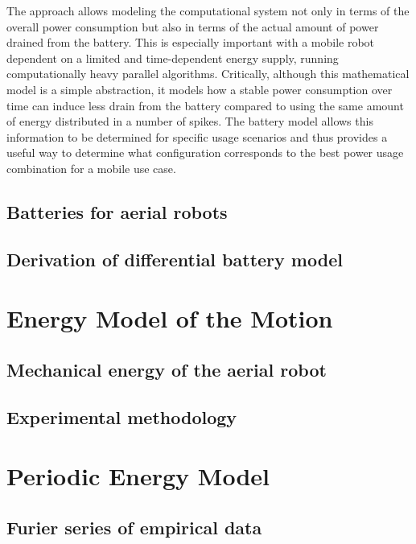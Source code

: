 The approach allows modeling the computational system not only in terms of the overall power consumption but also in terms of the actual amount of power drained from the battery. This is especially important with a mobile robot dependent on a limited and time-dependent energy supply, running computationally heavy parallel algorithms. Critically, although this mathematical model is a simple abstraction, it models how a stable power consumption over time can induce less drain from the battery compared to using the same amount of energy distributed in a number of spikes. The battery model allows this information to be determined for specific usage scenarios and thus provides a useful way to determine what configuration corresponds to the best power usage combination for a mobile use case.


\subsection{\color{orange}Batteries for aerial robots}

\subsection{\color{red}Derivation of differential battery model}


\section{\color{red}Energy Model of the Motion}

\subsection{\color{red}Mechanical energy of the aerial robot}

\subsection{\color{red}Experimental methodology}


\section{\color{red}Periodic Energy Model}

\subsection{\color{red}Furier series of empirical data}

